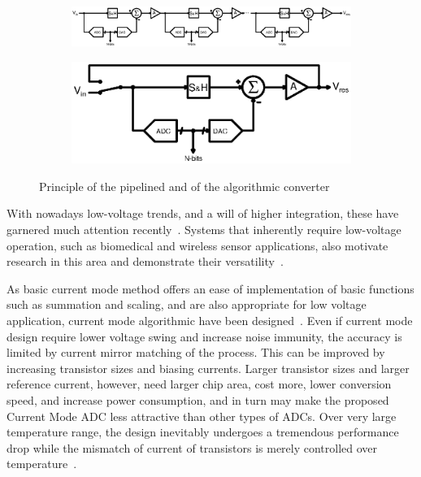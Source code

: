 \begin{figure}[htp]
	\centering
    \begin{subfigure}[b]{\textwidth}
        \includegraphics[width=\textwidth]{Chapter2/Figs/Vector/pipelined.ps}
        \vspace{2em}
        \label{fig:pipelined-principle}
	\end{subfigure}
	\begin{subfigure}[b]{0.4\textwidth}
        \includegraphics[width=\textwidth]{Chapter2/Figs/Vector/algorithmic.ps}
        \label{fig:algorithmic-principle}
    \end{subfigure}
	\caption{Principle of the pipelined and of the algorithmic converter}
	\label{fig:algo_desc}
\end{figure}

With nowadays low-voltage trends, and a will of higher integration, these have garnered much attention recently~\cite{Steyaert2012,Lee2011,SKLee2011,Brooks2009,Hershberg2012,YLim2015,YLim2015FD,Megawer2016,YCao2017}. Systems that inherently require low-voltage operation, such as biomedical and wireless sensor applications, also motivate research in this area and demonstrate their versatility~\cite{Steyaert2012,Lee2011,SKLee2011}.


As basic current mode method offers an ease of implementation of basic functions such as summation and scaling, and are also appropriate for low voltage application, current mode algorithmic have been designed~\cite{Nairn1990,Wang1991,Khodabndehloo2009,Bhatia2011}. Even if current mode design require lower voltage swing and increase noise immunity, the accuracy is limited by current mirror matching of the process. This can be improved by increasing transistor sizes and biasing currents. Larger transistor sizes and larger reference current, however, need larger chip area, cost more, lower conversion speed, and increase power consumption, and in turn may make the proposed Current Mode ADC less attractive than other types of ADCs\cite{Wang1991}. Over very large temperature range, the design inevitably undergoes a tremendous performance drop while the mismatch of current of transistors is merely controlled over temperature~\cite{Shoucair1989, Andricciola2009}.

